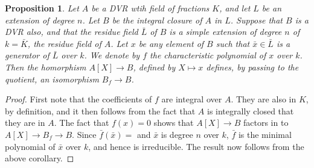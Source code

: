 \documentclass[11pt]{article} %
\newtheorem{prop}{Proposition}
\theoremstyle{remark}\newtheorem*{rem}{Remark}
\begin{document}
\begin{prop}
Let $A$ be a DVR wtih field of fractions $K$, and let $L$ be an extension of degree $n$.
Let $B$ be the integral closure of $A$ in $L$.
Suppose that $B$ is a DVR also, and that the residue field $\bar L$ of $B$ is a simple extension of degree $n$ of $k = \bar K$, the residue field of $A$.
Let $x$ be any element of $B$ such that $\bar x \in \bar L$ is a generator of $\bar L$ over $k$.
We denote by $f$ the characteristic polynomial of $x$ over $k$.
Then the homorphism $A[X]\rightarrow B$, defined by $X \mapsto x$ defines, by passing to the quotient, an isomorphism $B_f\rightarrow B$.
\end{prop}
\begin{proof}
First note that the coefficients of $f$ are integral over $A$.
They are also in $K$, by definition, and it then follows from the fact that $A$ is integrally closed that they are in $A$.
The fact that $f(x) = 0$ shows that $A[X]\rightarrow B$ factors in to $A[X]\rightarrow B_f \rightarrow B$.
Since $\bar f (\bar x) = $ and $\bar x$ is degree $n$ over $k$, $\bar f$ is the minimal polynomial of $\bar x$ over $k$, and hence is irreducible.
The result now follows from the above corollary.
\end{proof}
\end{document}
